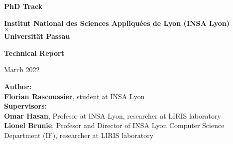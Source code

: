 \begin{titlepage}
    \begin{center}
        \vspace{1cm}
        \Large
        \textbf{PhD Track}

        \vspace{0.5cm}
        \normalsize
        \textbf{Institut National des Sciences Appliquées de Lyon (INSA Lyon)}\\
        $\times$ \\ %
        \textbf{Universität Passau}

        \vspace{2cm}
        \Huge
        \textbf{Technical Report}

        \vspace{1cm}
        \normalsize
        March 2022
        
        \vspace{2cm}

        \vfill

        \Large
        \textbf{Author:}\\
        \vspace{0.5cm}
        \normalsize
        \textbf{Florian Rascoussier}, student at INSA Lyon\\

        \vspace{0.5cm}
        \Large
        \textbf{Supervisors:}\\

        \vspace{0.5cm}
        \normalsize
        \textbf{Omar Hasan}, Profesor at INSA Lyon, researcher at LIRIS laboratory\\
        \textbf{Lionel Brunie}, Profesor and Director of INSA Lyon Computer Science Department (IF), researcher at LIRIS laboratory\\
            
    \end{center}
\end{titlepage}